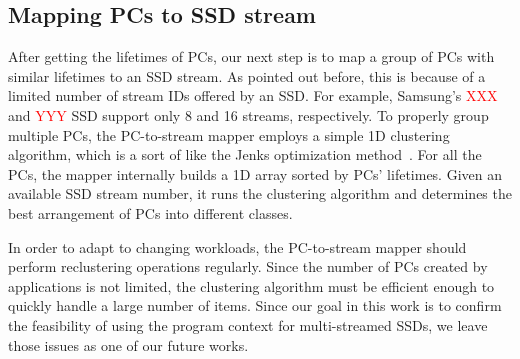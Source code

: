 \subsection{Mapping PCs to SSD stream}
After getting the lifetimes of PCs, our next step is to map a group of PCs with
similar lifetimes to an SSD stream. As pointed out before, this is because of a
limited number of stream IDs offered by an SSD. For example, Samsung's
\textcolor{red}{XXX} and \textcolor{red}{YYY} SSD support only 8 and 16
streams, respectively. To properly group multiple PCs, the PC-to-stream mapper
employs a simple 1D clustering algorithm, which is a sort of like the Jenks
optimization method~\cite{}.  For all the PCs, the mapper internally builds a
1D array sorted by PCs' lifetimes.  Given an available SSD stream number, it
runs the clustering algorithm and determines the best arrangement of PCs into
different classes.

In order to adapt to changing workloads, the PC-to-stream mapper should perform
reclustering operations regularly. Since the number of PCs created by
applications is not limited, the clustering algorithm must be efficient enough
to quickly handle a large number of items. Since our goal in this work is to
confirm the feasibility of using the program context for multi-streamed SSDs,
we leave those issues as one of our future works.


\vspace{-5pt}
